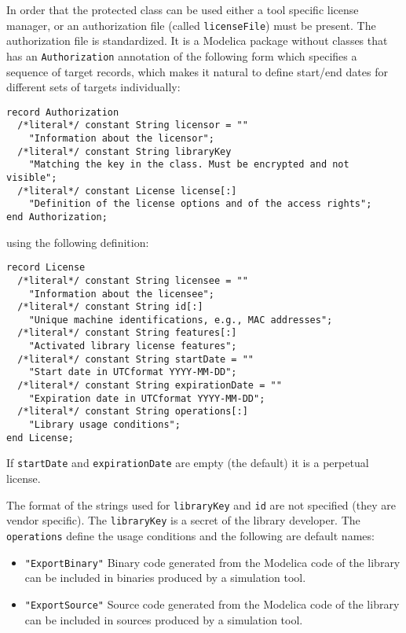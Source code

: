 In order that the protected class can be used either a tool specific license manager, or an authorization file (called \lstinline!licenseFile!) must be present.
The authorization file is standardized.
It is a Modelica package without classes that has an \lstinline!Authorization! annotation of the following form which specifies a sequence of target records, which makes it natural to define start/end dates for different sets of targets individually:
\begin{lstlisting}[language=modelica]
record Authorization
  /*literal*/ constant String licensor = ""
    "Information about the licensor";
  /*literal*/ constant String libraryKey
    "Matching the key in the class. Must be encrypted and not visible";
  /*literal*/ constant License license[:]
    "Definition of the license options and of the access rights";
end Authorization;
\end{lstlisting}%
using the following definition:
\begin{lstlisting}[language=modelica]
record License
  /*literal*/ constant String licensee = ""
    "Information about the licensee";
  /*literal*/ constant String id[:]
    "Unique machine identifications, e.g., MAC addresses";
  /*literal*/ constant String features[:]
    "Activated library license features";
  /*literal*/ constant String startDate = ""
    "Start date in UTCformat YYYY-MM-DD";
  /*literal*/ constant String expirationDate = ""
    "Expiration date in UTCformat YYYY-MM-DD";
  /*literal*/ constant String operations[:]
    "Library usage conditions";
end License;
\end{lstlisting}

If \lstinline!startDate! and \lstinline!expirationDate! are empty (the default) it is a perpetual license.

The format of the strings used for \lstinline!libraryKey! and \lstinline!id! are not specified (they are vendor specific).
The \lstinline!libraryKey! is a secret of the library developer.
The \lstinline!operations! define the usage conditions and the following are default names:
\begin{itemize}
\item
  \lstinline!"ExportBinary"! Binary code generated from the Modelica code of the library can be included in binaries produced by a simulation tool.
\item
  \lstinline!"ExportSource"! Source code generated from the Modelica code of the library can be included in sources produced by a simulation tool.
\end{itemize}

